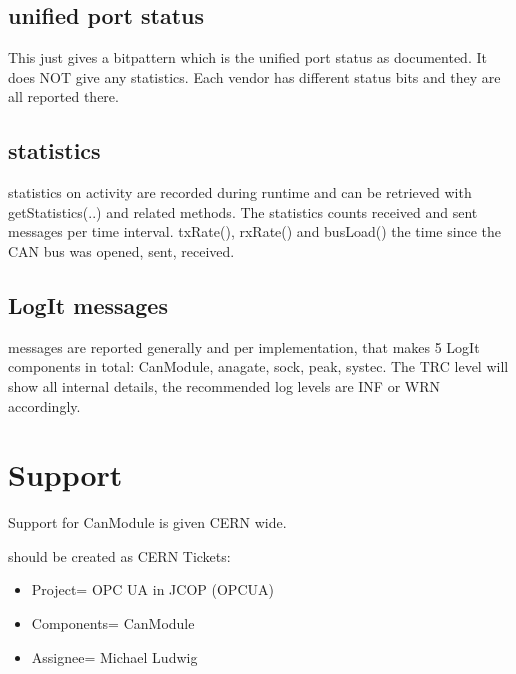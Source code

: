 \documentclass[a4paper,10pt,english]{sphinxmanual}
\begin{document}
\section{unified port status}
\label{\detokenize{errors:unified-port-status}}
\sphinxAtStartPar
This just gives a bitpattern which is the unified port status as documented. It does NOT give any statistics. Each vendor has different
status bits and they are all reported there.


\section{statistics}
\label{\detokenize{errors:statistics}}
\sphinxAtStartPar
statistics on activity are recorded during runtime and can be retrieved with getStatistics(..) and related methods.
The statistics
\sphinxhyphen{} counts received and sent messages per time interval.
\sphinxhyphen{} txRate(), rxRate() and busLoad()
\sphinxhyphen{} the time since the CAN bus was opened, sent, received.


\section{LogIt messages}
\label{\detokenize{errors:logit-messages}}
\sphinxAtStartPar
messages are reported generally and per implementation, that makes 5 LogIt components in total: CanModule, anagate, sock, peak, systec.
The TRC level will show all internal details, the recommended log levels are INF or WRN accordingly.


\chapter{Support}
\label{\detokenize{support:support}}\label{\detokenize{support::doc}}
\sphinxAtStartPar
Support for CanModule is given CERN wide.

\sphinxAtStartPar
{} should be created as CERN  Tickets:
\begin{itemize}
\item {} 
\sphinxAtStartPar
Project= OPC UA in JCOP (OPCUA)

\item {} 
\sphinxAtStartPar
Components= CanModule

\item {} 
\sphinxAtStartPar
Assignee= Michael Ludwig

\end{itemize}
\end{document}
